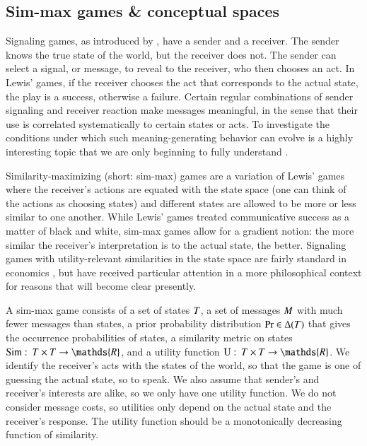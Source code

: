 \documentclass[fleqn,reqno,10pt]{article}
\newcommand{\similarity}{\ensuremath{\mathrm{Sim}}} %
\begin{document}
\subsection{Sim-max games \& conceptual spaces}

Signaling games, as introduced by \citet{Lewis_1969:Convention}, have
a sender and a receiver. The sender knows the true state of the world,
but the receiver does not. The sender can select a signal, or message,
to reveal to the receiver, who then chooses an act. In Lewis' games,
if the receiver chooses the act that corresponds to the actual state,
the play is a success, otherwise a failure. Certain regular
combinations of sender signaling and receiver reaction make messages
meaningful, in the sense that their use is correlated systematically
to certain states or acts. To investigate the conditions under which
such meaning-generating behavior can evolve is a highly interesting
topic that we are only beginning to fully understand
\citep[e.g.][]{Warneryd1993:Cheap-Talk-Coor,BlumeKim1993:Evolutionary-St,Huttegger2007:Evolution-and-t,Pawlowitsch2008:Why-Evolution-d,Barrett2009:The-Evolution-o,HutteggerSkyrms2010:Evolutionary-Dy,Skyrms2010:Signals}.

Similarity-maximizing (short: sim-max) games are a variation of
Lewis' games where the receiver's actions are equated with the state
space (one can think of the actions as choosing states) and different states are allowed to be more or less
similar to one another. While Lewis' games treated communicative
success as a matter of black and white, sim-max games allow for a
gradient notion: the more similar the receiver's interpretation is to
the actual state, the better. Signaling games with utility-relevant
similarities in the state space are fairly standard in economics
\citep[e.g.][]{Spence1973:Job-market-sign,CrawfordSobel1982:Strategic-Infor},
but have received particular attention in a more philosophical context
for reasons that will become clear presently.

A sim-max game consists of a set of states $T$, a set of
messages $M$ with much fewer messages than states, a prior
probability distribution $\Pr \in \Delta(T)$ that gives the
occurrence probabilities of states, a similarity metric on states
$\similarity \mycolon \States \times \States \rightarrow \mathds{R}$,
and a utility function $\Utils \mycolon \States \times \States
\rightarrow \mathds{R}$. We identify the receiver's acts with the
states of the world, so that the game is one of guessing the actual
state, so to speak. We also assume that sender's and receiver's
interests are alike, so we only have one utility function. We do not
consider message costs, so utilities only depend on the actual state
and the receiver's response. The utility function should be a
monotonically decreasing function of similarity.
\end{document}
